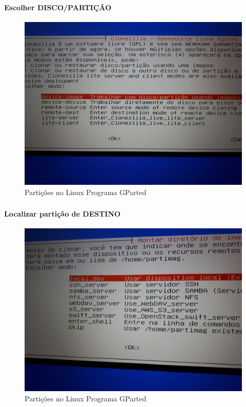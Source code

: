 \documentclass{beamer}
\begin{document}
\begin{frame}[plain,c]
   \frametitle{\insertsection}
    \framesubtitle{Escolher DISCO/PARTIÇÃO}
    \begin{figure}[!h]
        
        \includegraphics[width=1\linewidth]{images/backup/bkp6.jpg}
        \caption{Partições no Linux Programa GParted}
    \end{figure}
\end{frame}

\begin{frame}[plain,c]
   \frametitle{\insertsection}
    \framesubtitle{Localizar partição de DESTINO}
    \begin{figure}[!h]
        
        \includegraphics[width=1\linewidth]{images/backup/bkp7.jpg}
        \caption{Partições no Linux Programa GParted}
    \end{figure}
\end{frame}
\end{document}
